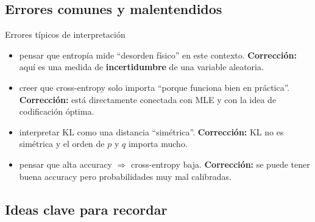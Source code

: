 \subsection[Errores]{Errores comunes y malentendidos}

\begin{frame}{Errores típicos de interpretación}
\begin{itemize}
  \item {} pensar que entropía mide “desorden físico” en este contexto.\newline
  \textbf{Corrección:} aquí es una medida de \textbf{incertidumbre} de una variable aleatoria.
  \item {} creer que cross-entropy solo importa “porque funciona bien en práctica”.\newline
  \textbf{Corrección:} está directamente conectada con MLE y con la idea de codificación óptima.
  \item {} interpretar KL como una distancia “simétrica”.\newline
  \textbf{Corrección:} KL no es simétrica y el orden de \(p\) y \(q\) importa mucho.
  \item {} pensar que alta accuracy \(\Rightarrow\) cross-entropy baja.\newline
  \textbf{Corrección:} se puede tener buena accuracy pero probabilidades muy mal calibradas.
\end{itemize}
\end{frame}

\subsection[Resumen]{Ideas clave para recordar}

